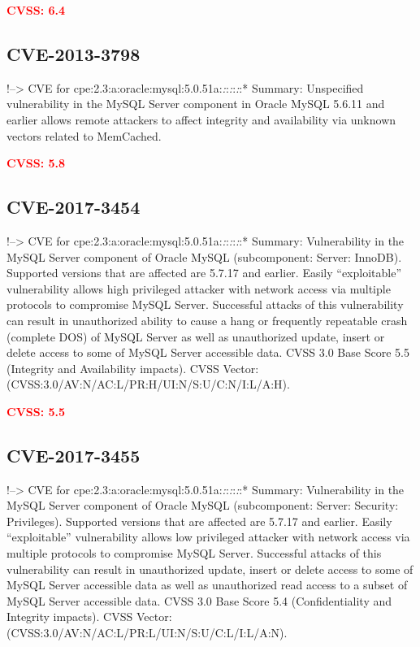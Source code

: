 \documentclass[a4paper, 12pt]{article}
\begin{document}
\textbf{\textcolor{red}{CVSS: 6.4}}

\hypertarget{cve-2013-3798}{%
\subsection{CVE-2013-3798}\label{cve-2013-3798}}

!--\textgreater{} CVE for
cpe:2.3:a:oracle:mysql:5.0.51a:\emph{:}:\emph{:}:\emph{:}:* Summary:
Unspecified vulnerability in the MySQL Server component in Oracle MySQL
5.6.11 and earlier allows remote attackers to affect integrity and
availability via unknown vectors related to MemCached.

\textbf{\textcolor{red}{CVSS: 5.8}}

\hypertarget{cve-2017-3454}{%
\subsection{CVE-2017-3454}\label{cve-2017-3454}}

!--\textgreater{} CVE for
cpe:2.3:a:oracle:mysql:5.0.51a:\emph{:}:\emph{:}:\emph{:}:* Summary:
Vulnerability in the MySQL Server component of Oracle MySQL
(subcomponent: Server: InnoDB). Supported versions that are affected are
5.7.17 and earlier. Easily ``exploitable'' vulnerability allows high
privileged attacker with network access via multiple protocols to
compromise MySQL Server. Successful attacks of this vulnerability can
result in unauthorized ability to cause a hang or frequently repeatable
crash (complete DOS) of MySQL Server as well as unauthorized update,
insert or delete access to some of MySQL Server accessible data. CVSS
3.0 Base Score 5.5 (Integrity and Availability impacts). CVSS Vector:
(CVSS:3.0/AV:N/AC:L/PR:H/UI:N/S:U/C:N/I:L/A:H).

\textbf{\textcolor{red}{CVSS: 5.5}}

\hypertarget{cve-2017-3455}{%
\subsection{CVE-2017-3455}\label{cve-2017-3455}}

!--\textgreater{} CVE for
cpe:2.3:a:oracle:mysql:5.0.51a:\emph{:}:\emph{:}:\emph{:}:* Summary:
Vulnerability in the MySQL Server component of Oracle MySQL
(subcomponent: Server: Security: Privileges). Supported versions that
are affected are 5.7.17 and earlier. Easily ``exploitable''
vulnerability allows low privileged attacker with network access via
multiple protocols to compromise MySQL Server. Successful attacks of
this vulnerability can result in unauthorized update, insert or delete
access to some of MySQL Server accessible data as well as unauthorized
read access to a subset of MySQL Server accessible data. CVSS 3.0 Base
Score 5.4 (Confidentiality and Integrity impacts). CVSS Vector:
(CVSS:3.0/AV:N/AC:L/PR:L/UI:N/S:U/C:L/I:L/A:N).
\end{document}
